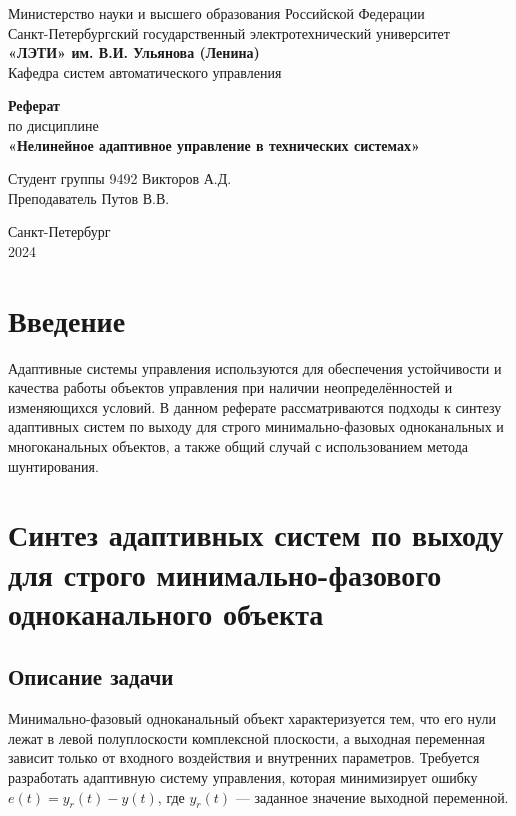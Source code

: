 \documentclass[a4paper,14pt]{extarticle} %
\begin{document}
\begin{titlepage}
    \begin{center}
        \large
        Министерство науки и высшего образования Российской Федерации \\
        Санкт-Петербургский государственный электротехнический университет \\
        \textbf{«ЛЭТИ» им. В.И. Ульянова (Ленина)} \\
        Кафедра систем автоматического управления

        \vfill

        \textbf{Реферат} \\
        по дисциплине \\
        \textbf{«Нелинейное адаптивное управление в технических системах»}

        \vfill

        Студент группы 9492 \hfill Викторов А.Д. \\
        Преподаватель \hfill Путов В.В.

        \vfill
        Санкт-Петербург \\
        2024
    \end{center}
\end{titlepage}

\setcounter{page}{2}
\tableofcontents

\newpage
\section*{Введение}
Адаптивные системы управления используются для обеспечения устойчивости и качества работы объектов управления при наличии неопределённостей и изменяющихся условий. В данном реферате рассматриваются подходы к синтезу адаптивных систем по выходу для строго минимально-фазовых одноканальных и многоканальных объектов, а также общий случай с использованием метода шунтирования.

\section{Синтез адаптивных систем по выходу для строго минимально-фазового одноканального объекта}
\subsection*{Описание задачи}
Минимально-фазовый одноканальный объект характеризуется тем, что его нули лежат в левой полуплоскости комплексной плоскости, а выходная переменная зависит только от входного воздействия и внутренних параметров. Требуется разработать адаптивную систему управления, которая минимизирует ошибку $e(t) = y_r(t) - y(t)$, где $y_r(t)$ — заданное значение выходной переменной.
\end{document}
